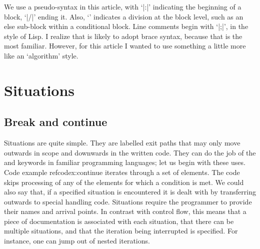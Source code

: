 \documentclass[10pt]{amsart}
\begin{document}
We use a pseudo-syntax in this article, with `|:|' indicating the
beginning of a block, `|/|' ending it.  Also, `\texttt{\cdedent}'
indicates a division at the block level, such as an else sub-block
within a conditional block.  Line comments begin with `|;|', in the
style of Lisp.  I realize that \Utop is likely to adopt brace syntax,
because that is the most familiar.  However, for this article I wanted
to use something a little more like an `algorithm' style.



\section{Situations}


\subsection{Break and continue}

Situations are quite simple.  They are labelled exit paths that may
only move outwards in scope and downwards in the written code.  They
can do the job of the \texttt{} and \texttt{}
keywords in familiar programming languages; let us begin with these
uses.  Code example ref{codex:continue} iterates through a set of
elements.  The code skips processing of any of the elements for which
a condition is met.  We could also say that, if a specified situation
is encountered it is dealt with by transferring outwards to special
handling code.
%
Situations require the programmer to provide their names and arrival
points.  In contrast with \texttt{} control flow, this
means that a piece of documentation is associated with each situation,
that there can be multiple situations, and that the iteration being
interrupted is specified.  For instance, one can jump out of nested
iterations.
\end{document}
